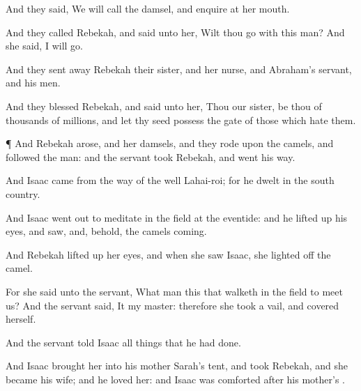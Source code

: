 {And they
said, We will
call the
damsel, and
enquire at her
mouth.

And they
called
Rebekah, and
said unto her, Wilt thou
go with this
man? And she
said, I will
go.

And they sent
away
Rebekah their
sister, and her
nurse, and
Abraham’s
servant, and his
men.

And they
blessed
Rebekah, and
said unto her,
Thou
{} our
sister, be
thou
{} of
thousands of
millions, and let thy
seed
possess the
gate of those which
hate them.


\par }{\PP {}¶ And
Rebekah
arose, and her
damsels, and they
rode upon the
camels, and
followed the
man: and the
servant
took
Rebekah, and went his
way.


\par }{\PP {}And
Isaac
came from the
way of the well
Lahai-roi; for he
dwelt in the
south
country.

And
Isaac went
out to
meditate in the
field
at the
eventide: and he lifted
up his
eyes, and
saw, and, behold, the
camels
{}
coming.

And
Rebekah lifted
up her
eyes, and when she
saw
Isaac, she
lighted
off the
camel.

For she
{}
said unto the
servant,
What
man
{}
this that
walketh in the
field to meet
us? And the
servant
{}
said, It
{} my
master: therefore she
took a
vail, and covered
herself.

And the
servant
told
Isaac all
things that he had
done.

And
Isaac brought
her into his
mother
Sarah’s
tent, and
took
Rebekah, and she became his
wife; and he
loved her: and
Isaac was
comforted
after his
mother’s
{}.




\par }
